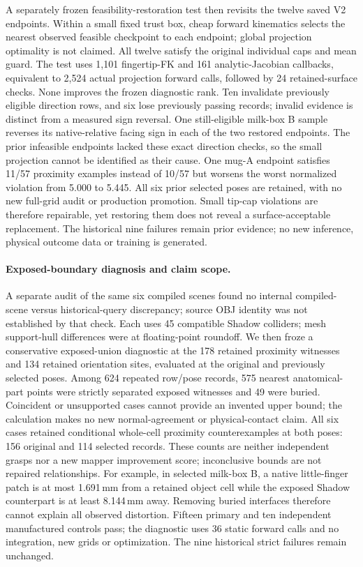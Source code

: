 A separately frozen feasibility-restoration test then revisits the twelve saved
V2 endpoints. Within a small fixed trust box, cheap forward kinematics selects
the nearest observed feasible checkpoint to each endpoint; global projection
optimality is not claimed. All twelve satisfy the original individual caps
and mean guard. The test uses 1,101 fingertip-FK and 161 analytic-Jacobian
callbacks, equivalent to 2,524 actual projection forward calls, followed by
24 retained-surface checks. None improves the frozen diagnostic rank. Ten
invalidate previously eligible direction rows, and six lose previously
passing records; invalid evidence is distinct from a measured sign reversal.
One still-eligible milk-box B sample reverses its native-relative facing sign
in each of the two restored endpoints.
The prior infeasible endpoints lacked these exact direction checks, so the
small projection cannot be identified as their cause. One mug-A endpoint
satisfies 11/57 proximity examples instead of 10/57 but worsens the worst
normalized violation from 5.000 to 5.445. All six prior selected poses are
retained, with no new full-grid audit or production promotion. Small tip-cap
violations are therefore repairable, yet restoring them does not reveal a
surface-acceptable replacement. The historical nine failures remain prior
evidence; no new inference, physical outcome data or training is generated.
\paragraph{Exposed-boundary diagnosis and claim scope.}
A separate audit of the same six compiled scenes found no internal
compiled-scene versus historical-query discrepancy; source OBJ identity was
not established by that check. Each uses 45 compatible Shadow colliders;
mesh support-hull differences were at floating-point roundoff. We then froze a
conservative exposed-union diagnostic at the 178 retained proximity witnesses
and 134 retained orientation sites, evaluated at the original and previously
selected poses. Among 624 repeated row/pose records, 575 nearest anatomical-part
points were strictly separated exposed witnesses and 49 were buried. Coincident
or unsupported cases cannot provide an invented upper bound; the calculation
makes no new normal-agreement or physical-contact claim. All six cases retained
conditional whole-cell proximity counterexamples at both poses: 156 original
and 114 selected records. These counts are neither independent grasps nor a new
mapper improvement score; inconclusive bounds are not repaired relationships.
For example, in selected milk-box B, a native little-finger patch is at most
1.691\,mm from a retained object cell while the exposed Shadow counterpart is
at least 8.144\,mm away. Removing buried interfaces therefore cannot explain all
observed distortion. Fifteen primary and ten independent manufactured controls
pass; the diagnostic uses 36 static forward calls and no integration, new grids
or optimization. The nine historical strict failures remain unchanged.


